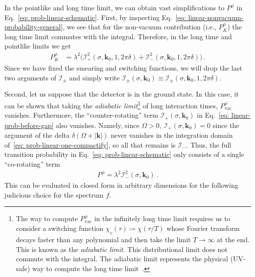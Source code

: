 \documentclass[prd,twocolumn,superscriptaddress,nofootinbib,floatfix,amsmath,amssymb]{revtex4-2}
\newcommand{\bk}{{\bm{k}}}
\newcommand{\vac}{\text{vac}}
\begin{document}
    In the pointlike and long time limit, we can obtain vast simplifications to $P^\phi$ in Eq.~\eqref{eq: prob-linear-schematic}. First, by inspecting Eq.~\eqref{eq: linear-nonvacuum-probability-general}, we see that for the non-vacuum contribution (i.e., $P_K^\phi$) the long time limit commutes with the integral. Therefore, in the long time and pointlike limits we get
    \begin{align}
        P_{K}^{\phi} &= \lambda^2 \bigr(\mathcal{I}_+^2(\sigma,\bk_0,1, 2\pi\delta)+
        \mathcal{I}_{-}^2(\sigma,\bk_0,1, 2\pi\delta)\bigr)\,.
        \label{eq: linear-prob-before-gap}
    \end{align}
    Since we have fixed the smearing and switching functions, we will drop the last two arguments of $\mathcal{I}_\pm$ and simply write $\mathcal{I}_\pm (\sigma,\bk_0)\equiv \mathcal{I}_\pm (\sigma,\bk_0,1, 2\pi\delta)$.
    
    Second, let us suppose that the detector is in the ground state. In this case, it can be shown that taking the \textit{adiabatic limit}\footnote{The way to compute $P^\phi_{\vac}$ in the infinitely long time limit requires us to consider a switching function \mbox{$\chi_{_T}(\tau)\coloneqq \chi(\tau/T)$} whose Fourier transform decays faster than any polynomial and then take the limit $T\to\infty$ at the end. This is known as the \textit{adiabatic limit}. This distributional limit does not commute with the integral. The adiabatic limit represents the physical (UV-safe) way to compute the long time limit~{\cite{Satz_2007,Louko_2008}}.} of long interaction times, $P_{\vac}^{\phi}$ vanishes. Furthermore, the ``counter-rotating'' term $\mathcal{I}_+(\sigma,\bk_0)$ in Eq.~\eqref{eq: linear-prob-before-gap} also vanishes. Namely, since $\Omega>0$, \mbox{$\mathcal{I}_+(\sigma,\bk_0)=0$} since  the argument of the delta $\delta(\Omega+|\bm k |)$ never vanishes in  the integration domain of~\eqref{eq: prob-linear-one-compactify}, so all that remains is $\mathcal{I}_-$.  Thus, the full transition probability in Eq.~\eqref{eq: prob-linear-schematic} only consists of a single ``co-rotating'' term
    \begin{align}
        P^\phi = \lambda^2\mathcal{I}_-^2(\sigma,\bk_0)\,.
        \label{eq: final-linear-probability}
    \end{align}
    This can be evaluated in closed form in arbitrary dimensions for the following judicious choice for the spectrum $f$.
    	
    	
    	
\end{document}
